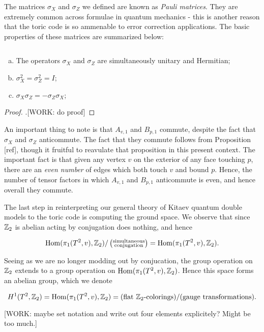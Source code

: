The matrices $\sigma_X$ and $\sigma_Z$ we defined are known as \textit{Pauli matrices}. They are extremely common across formulae in quantum mechanics - this is another reason that the toric code is so ammenable to error correction applications. The basic properties of these matrices are summarized below:

\begin{proposition}$\,$
\begin{enumerate}[(a)]
\item The operators $\sigma_X$ and $\sigma_Z$ are simultaneously unitary and Hermitian;
\item $\sigma_X^2=\sigma_Z^2=I$;
\item $\sigma_X \sigma_Z = - \sigma_Z \sigma_X$;
\end{enumerate}
\end{proposition}
\begin{proof}.[WORK: do proof]
\end{proof}

An important thing to note is that $A_{v,1}$ and $B_{p,1}$ commute, despite the fact that $\sigma_X$ and $\sigma_Z$ anticommute. The fact that they commute follows from Proposition [ref], though it fruitful to reavulate that proposition in this present context. The important fact is that given any vertex $v$ on the exterior of any face touching $p$,  there are an \textit{even number} of edges which both touch $v$ and bound $p$. Hence, the number of tensor factors in which $A_{v,1}$ and $B_{p,1}$ anticommute is even, and hence overall they commute.

The last step in reinterpreting our general theory of Kitaev quantum double models to the toric code is computing the ground space. We observe that since $\mathbb{Z}_2$ is abelian acting by conjugation does nothing, and hence

$$\operatorname{Hom}(\pi_1(T^2,v), \mathbb{Z}_2)/\left(\substack{\text{simultaneous} \\ \text{conjugation}}\right)=\operatorname{Hom}(\pi_1(T^2,v), \mathbb{Z}_2).$$

Seeing as we are no longer modding out by conjucation, the group operation on $\mathbb{Z}_2$ extends to a group operation on $\operatorname{Hom}(\pi_1(T^2,v), \mathbb{Z}_2)$. Hence this space forms an abelian group, which we denote

$$H^1(T^2,\mathbb{Z}_2)=\operatorname{Hom}(\pi_1(T^2,v), \mathbb{Z}_2)=(\text{flat $\mathbb{Z}_2$-colorings})/(\text{gauge transformations}).$$

[WORK: maybe set notation and write out four elements explicitely? Might be too much.]

